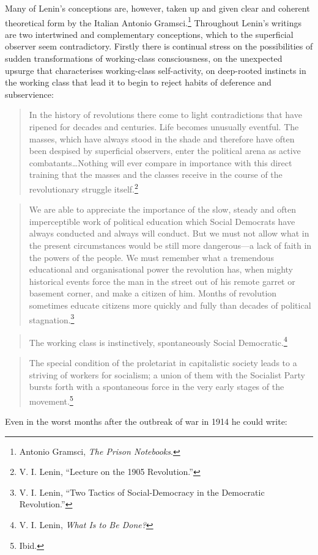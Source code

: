 Many of Lenin's conceptions are, however, taken up and given clear and coherent theoretical form by the Italian Antonio Gramsci.\footnote{Antonio Gramsci, \emph{The Prison Notebooks}.} Throughout Lenin's writings are two intertwined and complementary conceptions, which to the superficial observer seem contradictory. Firstly there is continual stress on the possibilities of sudden transformations of working-class consciousness, on the unexpected upsurge that characterises working-class self-activity, on deep-rooted instincts in the working class that lead it to begin to reject habits of deference and subservience:

\blockquote{In the history of revolutions there come to light contradictions that have ripened for decades and centuries. Life becomes unusually eventful. The masses, which have always stood in the shade and therefore have often been despised by superficial observers, enter the political arena as active combatants\ldots Nothing will ever compare in importance with this direct training that the masses and the classes receive in the course of the revolutionary struggle itself.\footnote{V. I. Lenin, ``Lecture on the 1905 Revolution.''}}

\blockquote{We are able to appreciate the importance of the slow, steady and often imperceptible work of political education which Social Democrats have always conducted and always will conduct. But we must not allow what in the present circumstances would be still more dangerous---a lack of faith in the powers of the people. We must remember what a tremendous educational and organisational power the revolution has, when mighty historical events force the man in the street out of his remote garret or basement corner, and make a citizen of him. Months of revolution sometimes educate citizens more quickly and fully than decades of political stagnation.\footnote{V. I. Lenin, ``Two Tactics of Social-Democracy in the Democratic Revolution.''}}

\blockquote{The working class is instinctively, spontaneously Social Democratic.\footnote{V. I. Lenin, \emph{What Is to Be Done?}}}

\blockquote{The special condition of the proletariat in capitalistic society leads to a striving of workers for socialism; a union of them with the Socialist Party bursts forth with a spontaneous force in the very early stages of the movement.\footnote{Ibid.}}

Even in the worst months after the outbreak of war in 1914 he could write:

